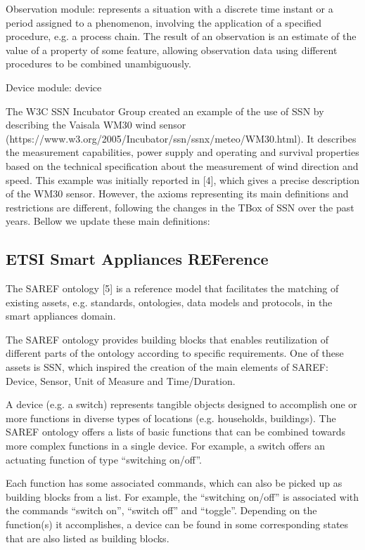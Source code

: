 \documentclass{sig-alternate-05-2015}
\begin{document}
Observation module: represents a situation with a discrete time instant or a period assigned to a phenomenon, involving the application of a specified procedure, e.g. a process chain. The result of an observation is an estimate of the value of a property of some feature, allowing observation data using different procedures to be combined unambiguously. 

Device module: device

The W3C SSN Incubator Group created an example of the use of SSN by describing the Vaisala WM30 wind sensor (https://www.w3.org/2005/Incubator/ssn/ssnx/meteo/WM30.html). It describes the measurement capabilities, power supply and operating and survival properties based on the technical specification about the measurement of wind direction and speed. This example was initially reported in [4], which gives a precise description of the WM30 sensor. However, the axioms representing its main definitions and restrictions are different, following the changes in the TBox of SSN over the past years. Bellow we update these main definitions:
\\




\subsection{ETSI Smart Appliances REFerence}
The SAREF ontology [5] is a reference model that facilitates the matching of existing assets, e.g. standards, ontologies, data models and protocols, in the smart appliances domain. 

The SAREF ontology provides building blocks that enables reutilization of different parts of the ontology according to specific requirements. One of these assets is SSN, which inspired the creation of the main elements of SAREF: Device, Sensor, Unit of Measure and Time/Duration. 

A device (e.g. a switch) represents tangible objects designed to accomplish one or more functions in diverse types of locations (e.g. households, buildings). The SAREF ontology offers a lists of basic functions that can be combined towards more complex functions in a single device. For example, a switch offers an actuating function of type “switching on/off”. 

Each function has some associated commands, which can also be picked up as building blocks from a list. For example, the “switching on/off” is associated with the commands “switch on”, “switch off” and “toggle”. Depending on the function(s) it accomplishes, a device can be found in some corresponding states that are also listed as building blocks. 
\end{document}
